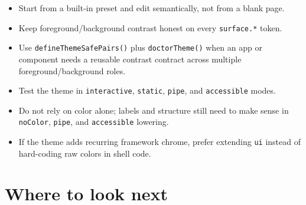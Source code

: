 \begin{itemize}
\tightlist
\item
  Start from a built-in preset and edit semantically, not from a blank page.
\item
  Keep foreground/background contrast honest on every \texttt{s\allowbreak{}u\allowbreak{}r\allowbreak{}f\allowbreak{}a\allowbreak{}c\allowbreak{}e\allowbreak{}.\allowbreak{}*} token.
\item
  Use \texttt{d\allowbreak{}e\allowbreak{}f\allowbreak{}i\allowbreak{}n\allowbreak{}e\allowbreak{}T\allowbreak{}h\allowbreak{}e\allowbreak{}m\allowbreak{}e\allowbreak{}S\allowbreak{}a\allowbreak{}f\allowbreak{}e\allowbreak{}P\allowbreak{}a\allowbreak{}i\allowbreak{}r\allowbreak{}s\allowbreak{}(\allowbreak{})} plus \texttt{d\allowbreak{}o\allowbreak{}c\allowbreak{}t\allowbreak{}o\allowbreak{}r\allowbreak{}T\allowbreak{}h\allowbreak{}e\allowbreak{}m\allowbreak{}e\allowbreak{}(\allowbreak{})} when an app or component needs a reusable contrast contract across multiple foreground/background roles.
\item
  Test the theme in \texttt{i\allowbreak{}n\allowbreak{}t\allowbreak{}e\allowbreak{}r\allowbreak{}a\allowbreak{}c\allowbreak{}t\allowbreak{}i\allowbreak{}v\allowbreak{}e}, \texttt{s\allowbreak{}t\allowbreak{}a\allowbreak{}t\allowbreak{}i\allowbreak{}c}, \texttt{p\allowbreak{}i\allowbreak{}p\allowbreak{}e}, and \texttt{a\allowbreak{}c\allowbreak{}c\allowbreak{}e\allowbreak{}s\allowbreak{}s\allowbreak{}i\allowbreak{}b\allowbreak{}l\allowbreak{}e} modes.
\item
  Do not rely on color alone; labels and structure still need to make sense in \texttt{n\allowbreak{}o\allowbreak{}C\allowbreak{}o\allowbreak{}l\allowbreak{}o\allowbreak{}r}, \texttt{p\allowbreak{}i\allowbreak{}p\allowbreak{}e}, and \texttt{a\allowbreak{}c\allowbreak{}c\allowbreak{}e\allowbreak{}s\allowbreak{}s\allowbreak{}i\allowbreak{}b\allowbreak{}l\allowbreak{}e} lowering.
\item
  If the theme adds recurring framework chrome, prefer extending \texttt{u\allowbreak{}i} instead of hard-coding raw colors in shell code.
\end{itemize}

\section{Where to look next}\label{record-026-where-to-look-next}

